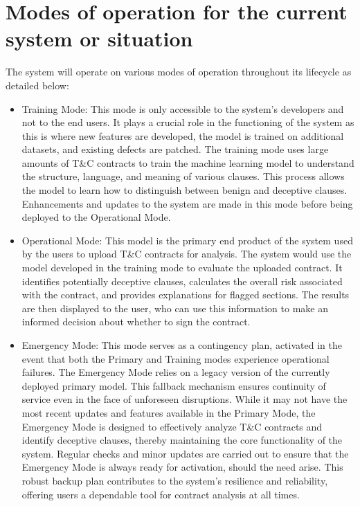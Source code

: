  



\section{Modes of operation for the current system or situation \label{Section::Modes of Operation for the current system or situation}}
The system will operate on various modes of operation throughout its lifecycle as detailed below: 
\begin{itemize}
    \item Training Mode: This mode is only accessible to the system's developers and not to the end users. It plays a crucial role in the functioning of the system as this is where new features are developed, the model is trained on additional datasets, and existing defects are patched. The training mode uses large amounts of T\&C contracts to train the machine learning model to understand the structure, language, and meaning of various clauses. This process allows the model to learn how to distinguish between benign and deceptive clauses. Enhancements and updates to the system are made in this mode before being deployed to the Operational Mode. 
    \item Operational Mode: This model is the primary end product of the system used by the users to upload T\&C contracts for analysis. The system would use the model developed in the training mode to evaluate the uploaded contract. It identifies potentially deceptive clauses, calculates the overall risk associated with the contract, and provides explanations for flagged sections. The results are then displayed to the user, who can use this information to make an informed decision about whether to sign the contract.
    \item Emergency Mode: This mode serves as a contingency plan, activated in the event that both the Primary and Training modes experience operational failures. The Emergency Mode relies on a legacy version of the currently deployed primary model. This fallback mechanism ensures continuity of service even in the face of unforeseen disruptions. While it may not have the most recent updates and features available in the Primary Mode, the Emergency Mode is designed to effectively analyze T&C contracts and identify deceptive clauses, thereby maintaining the core functionality of the system. Regular checks and minor updates are carried out to ensure that the Emergency Mode is always ready for activation, should the need arise. This robust backup plan contributes to the system's resilience and reliability, offering users a dependable tool for contract analysis at all times.
    


\end{itemize}


